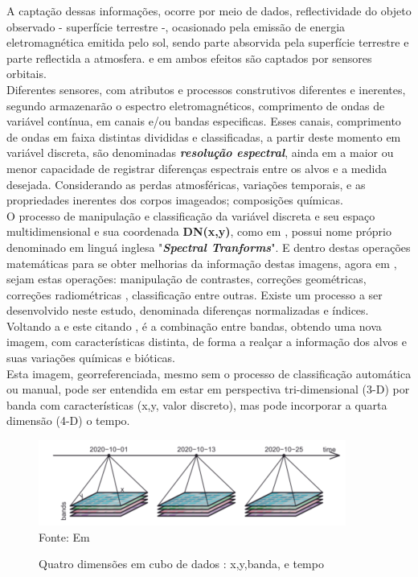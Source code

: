 	\hspace*{1.25 cm} A captação dessas informações, ocorre por meio de dados, reflectividade do objeto observado - superfície terrestre -, ocasionado pela emissão de energia eletromagnética emitida pelo sol, sendo parte absorvida pela  superfície terrestre e parte reflectida a atmosfera. e em ambos efeitos são  captados  por sensores orbitais.\\
	\hspace*{1.25 cm} Diferentes sensores, com atributos e processos construtivos diferentes e  inerentes, segundo \cite[p.~20]{Centeno} armazenarão o espectro eletromagnéticos, comprimento de ondas de variável contínua, em canais e/ou bandas especificas. Esses canais, comprimento de ondas em faixa distintas divididas e  classificadas, a partir deste momento em variável discreta,  são denominadas \textbf{\textit{resolução espectral}}, ainda em \cite[p.~54]{Centeno} a maior ou menor capacidade de registrar diferenças espectrais entre os alvos e a medida desejada. Considerando as perdas atmosféricas, variações temporais, e as propriedades inerentes dos corpos imageados; composições químicas. \\
	\hspace*{1.25 cm} O processo  de manipulação e classificação da variável discreta e seu espaço multidimensional e sua coordenada  \textbf{DN(x,y)}, como em \cite[p.~183]{Schowengerdt}, possui nome próprio denominado em linguá inglesa  "\textbf{\textit{Spectral Tranforms}}". E dentro destas operações matemáticas para se obter melhorias da informação destas imagens, agora em \cite[p.~485]{Lilesat}, sejam estas operações: manipulação de contrastes, correções geométricas, correções radiométricas , classificação entre outras. Existe um processo a ser desenvolvido neste estudo, denominada diferenças normalizadas e índices.\\
	\hspace*{1.25 cm} Voltando a \cite{Centeno} e este citando \cite[p.339]{Chuvieco}, é a combinação entre bandas, obtendo uma nova imagem, com características distinta, de forma a realçar a informação dos alvos e suas variações químicas e bióticas. \\
	\hspace*{1.25 cm} Esta imagem, georreferenciada, mesmo sem o processo de classificação automática ou manual, pode ser entendida em estar em  perspectiva tri-dimensional (3-D) por banda com características (x,y, valor discreto), mas pode incorporar  a quarta dimensão (4-D) o tempo.
	\begin{figure}[H]
		\centering  \small \caption{Quatro dimensões  em cubo de dados : x,y,banda, e tempo}
		\includegraphics[width=0.97\linewidth]{FIGURAS//quatroDimensao}
		\label{fig:quatroDimensao}{ Fonte:  Em \cite[p.60]{Pebesma} }
	\end{figure}
